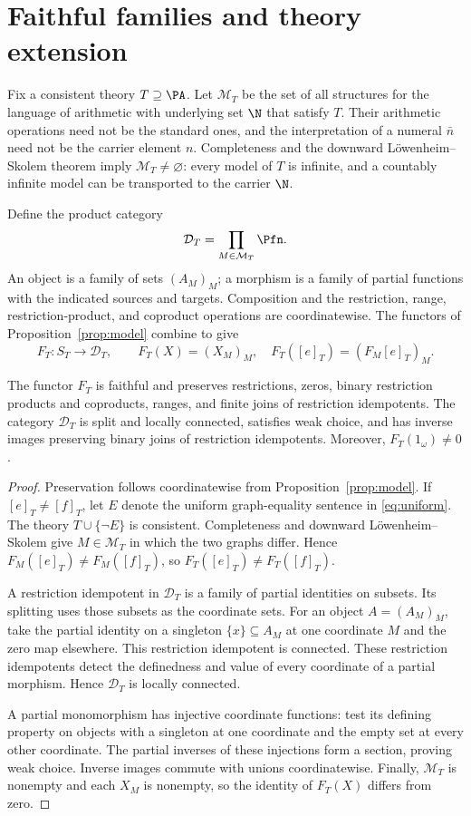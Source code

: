 \section{Faithful families and theory extension}\label{sec:family}

Fix a consistent theory $T\supseteq\PA$.
Let $\mathcal M_T$ be the set of all structures for the language of
arithmetic with underlying set $\N$ that satisfy $T$. Their arithmetic
operations need not be the standard ones, and the interpretation of a
numeral $\bar n$ need not be the carrier element $n$. Completeness and
the downward L\"owenheim--Skolem theorem imply
$\mathcal M_T\ne\varnothing$: every model of $T$ is infinite, and a
countably infinite model can be transported to the carrier $\N$.

Define the product category
\[
 \mathcal D_T=\prod_{M\in\mathcal M_T}\Pfn.
\]
An object is a family of sets $(A_M)_M$; a morphism is a family of partial
functions with the indicated sources and targets. Composition and the
restriction, range, restriction-product, and coproduct operations are coordinatewise.
The functors of Proposition~\ref{prop:model} combine to give
\[
 F_T:S_T\longrightarrow\mathcal D_T,\qquad
 F_T(X)=(X_M)_M,\quad F_T([e]_T)=(F_M[e]_T)_M.
\]

\begin{theorem}\label{thm:faithful}
The functor $F_T$ is faithful and preserves restrictions, zeros, binary
restriction products and coproducts, ranges, and finite joins of
restriction idempotents. The category
$\mathcal D_T$ is split and locally connected, satisfies weak choice,
and has inverse images preserving binary joins of restriction
idempotents. Moreover,
$F_T(1_\omega)\ne0$.
\end{theorem}
\begin{proof}
Preservation follows coordinatewise from Proposition~\ref{prop:model}.
If $[e]_T\ne[f]_T$, let $E$ denote the uniform graph-equality sentence
in \eqref{eq:uniform}. The theory $T\cup\{\neg E\}$ is consistent.
Completeness and downward L\"owenheim--Skolem give
$M\in\mathcal M_T$ in which the two graphs differ. Hence
$F_M([e]_T)\ne F_M([f]_T)$, so $F_T([e]_T)\ne F_T([f]_T)$.

A restriction idempotent in $\mathcal D_T$ is a family of partial
identities on subsets. Its splitting uses those subsets as the
coordinate sets. For an object $A=(A_M)_M$, take the partial identity
on a singleton $\{x\}\subseteq A_M$ at one coordinate $M$ and the zero
map elsewhere. This restriction idempotent is connected. These
restriction idempotents detect the definedness and value of every coordinate of a partial morphism. Hence
$\mathcal D_T$ is locally connected.

A partial monomorphism has injective coordinate functions: test its
defining property on objects with a singleton at one coordinate
and the empty set at every other coordinate.
The partial inverses of these injections form a section, proving weak
choice. Inverse images commute with unions coordinatewise. Finally,
$\mathcal M_T$ is nonempty and each $X_M$ is nonempty, so the
identity of $F_T(X)$ differs from zero.
\end{proof}

